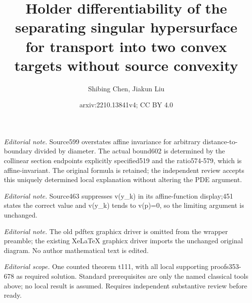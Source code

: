 \documentclass[10pt,a4paper]{amsart}
\title{Holder differentiability of the separating singular hypersurface for transport into two convex targets without source convexity}
\author{Shibing Chen, Jiakun Liu}
\date{arxiv:2210.13841v4; CC BY 4.0}
\theoremstyle{plain}
\newcommand{\0}{\textbf{0}}
\numberwithin{equation}{section}
\numberwithin{equation}{section}
\numberwithin{figure}{section}
\begin{document}
\maketitle
\noindent\textit{Editorial note.} Source599 overstates affine invariance for arbitrary distance-to-boundary divided by diameter. The actual bound602 is determined by the collinear section endpoints explicitly specified519 and the ratio574-579, which is affine-invariant. The original formula is retained; the independent review accepts this uniquely determined local explanation without altering the PDE argument.\par\medskip
\noindent\textit{Editorial note.} Source463 suppresses v(y\_k) in its affine-function display;451 states the correct value and v(y\_k) tends to v(p)=0, so the limiting argument is unchanged.\par\medskip
\noindent\textit{Editorial note.} The old pdftex graphicx driver is omitted from the wrapper preamble; the existing XeLaTeX graphicx driver imports the unchanged original diagram. No author mathematical text is edited.\par\medskip
\noindent\textit{Editorial scope.} One counted theorem t111, with all local supporting proofs353-678 as required solution. Standard prerequisites are only the named classical tools above; no local result is assumed. Requires independent substantive review before ready.\par\medskip
\end{document}
